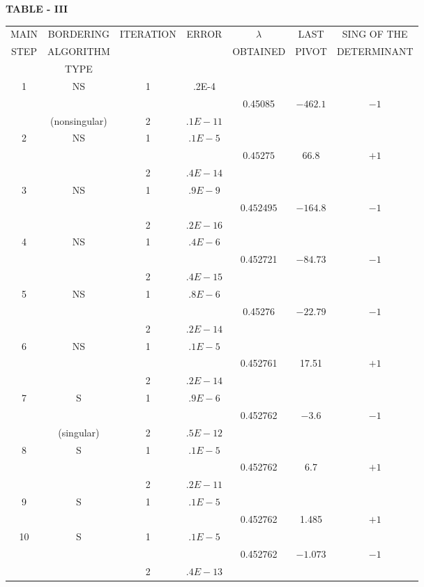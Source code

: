 {\fontsize{8}{10}\selectfont
  \begin{center}
{\bf TABLE - III}\pageoriginale

\medskip
\renewcommand{\arraystretch}{1.4}
\tabcolsep=2pt
\begin{tabular}{ccccccc}
\hline
MAIN & BORDERING  & ITERATION & ERROR & $\lambda$ &  LAST &  SING OF THE \\
STEP & ALGORITHM & & & OBTAINED & PIVOT & DETERMINANT \\
& TYPE \\ 
\hline
1 & NS & 1 & .2E-4 \\
& & & & 0.45085 & $-462.1$ & $-1$ \\
& (nonsingular) & 2 & .$1E-11$ \\
\hline
2 & NS & 1 & .$1E-5$ \\
& & & & $0.45275$ & $66.8$ & $+1$ \\
& & 2 & .$4E-14$ \\
\hline
3 & NS & 1 & .$9E-9$ \\
& & & & $0.452495$ & $-164.8$ & $-1$ \\
& & 2 & .$2E-16$ \\
\hline
4 & NS & 1 & .$4E-6$\\
& & & & 0.452721 & $-84.73$ & $-1$ \\
& & 2 & .$4E-15$ \\
\hline
5 & NS & 1 & .$8E-6$ \\
& & & & 0.45276 & $-22.79$ & $-1$ \\
& & 2 & .$2E-14$ \\
\hline
6 & NS & 1 & .$1E-5$ \\
& & & & 0.452761 & 17.51 & $+1$ \\
& & 2 & .$2E-14$ \\
\hline
7 & S & 1 & .$9E-6$ \\
& & & & 0.452762 & $- 3.6$ & $-1$ \\
& (singular)& 2 & .$5E-12$ \\
\hline
8 & S & 1 & .$1E-5$ \\
& & & & 0.452762 & 6.7 & $+1$ \\
& & 2 & .$2E-11$ \\
\hline
9 & S & 1 & .$1E-5$ \\
& & & & 0.452762 & 1.485 & $+ 1$ \\
\hline
10 & S & 1 & .$1E-5$ \\
& & & & 0.452762 & $-1.073$ & $-1$ \\
& & 2 & .$4E-13$ \\
\hline
\end{tabular}
  \end{center}}\relax

